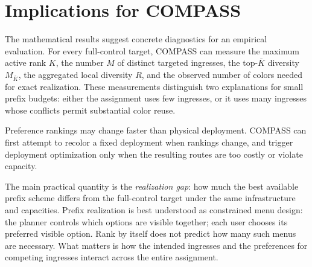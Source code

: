 \documentclass[10pt,a4paper]{article}
\begin{document}
\section{Implications for COMPASS}

The mathematical results suggest concrete diagnostics for an empirical evaluation. For every full-control target, COMPASS can measure the maximum active rank $K$, the number $M$ of distinct targeted ingresses, the top-$\bar K$ diversity $M_{\bar K}$, the aggregated local diversity $R$, and the observed number of colors needed for exact realization. These measurements distinguish two explanations for small prefix budgets: either the assignment uses few ingresses, or it uses many ingresses whose conflicts permit substantial color reuse.

Preference rankings may change faster than physical deployment. COMPASS can first attempt to recolor a fixed deployment when rankings change, and trigger deployment optimization only when the resulting routes are too costly or violate capacity.

The main practical quantity is the \emph{realization gap}: how much the best available prefix scheme differs from the full-control target under the same infrastructure and capacities. Prefix realization is best understood as constrained menu design: the planner controls which options are visible together; each user chooses its preferred visible option. Rank by itself does not predict how many such menus are necessary. What matters is how the intended ingresses and the preferences for competing ingresses interact across the entire assignment.
\end{document}
